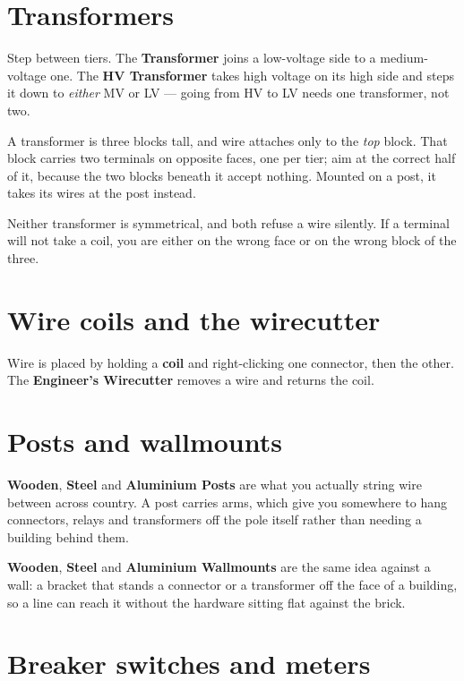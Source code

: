 \section{Transformers}

Step between tiers. The \textbf{Transformer} joins a low-voltage side to a medium-voltage one. The
\textbf{HV Transformer} takes high voltage on its high side and steps it down to \emph{either} MV or
LV --- going from HV to LV needs one transformer, not two.

A transformer is three blocks tall, and wire attaches only to the \emph{top} block. That block
carries two terminals on opposite faces, one per tier; aim at the correct half of it, because the
two blocks beneath it accept nothing. Mounted on a post, it takes its wires at the post instead.

\begin{ietip}
Neither transformer is symmetrical, and both refuse a wire silently. If a terminal will not take a
coil, you are either on the wrong face or on the wrong block of the three.
\end{ietip}

\section{Wire coils and the wirecutter}

Wire is placed by holding a \textbf{coil} and right-clicking one connector, then the other. The
\textbf{Engineer's Wirecutter} removes a wire and returns the coil.

\section{Posts and wallmounts}

\textbf{Wooden}, \textbf{Steel} and \textbf{Aluminium Posts} are what you actually string wire
between across country. A post carries arms, which give you somewhere to hang connectors, relays
and transformers off the pole itself rather than needing a building behind them.

\textbf{Wooden}, \textbf{Steel} and \textbf{Aluminium Wallmounts} are the same idea against a wall:
a bracket that stands a connector or a transformer off the face of a building, so a line can reach
it without the hardware sitting flat against the brick.

\section{Breaker switches and meters}

